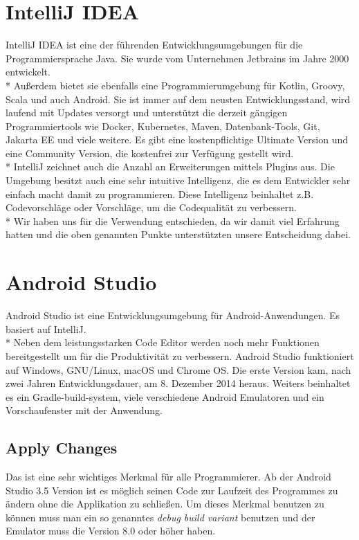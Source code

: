 \section{IntelliJ IDEA}
\author{Benjamin Besic}

IntelliJ IDEA ist eine der führenden Entwicklungsumgebungen für die Programmiersprache Java. Sie wurde vom Unternehmen Jetbrains im Jahre 2000 entwickelt.
\\* Außerdem bietet sie ebenfalls eine Programmierumgebung für Kotlin, Groovy, Scala und auch Android.
 Sie ist immer auf dem neusten Entwicklungsstand, wird laufend mit Updates versorgt und unterstützt die derzeit gängigen Programmiertools
wie Docker, Kubernetes, Maven, Datenbank-Tools, Git, Jakarta EE und viele weitere.
Es gibt eine kostenpflichtige Ultimate Version und eine Community Version, die kostenfrei zur Verfügung gestellt wird.
\\* IntelliJ zeichnet auch die Anzahl an Erweiterungen mittels Plugins aus. Die Umgebung besitzt auch eine
sehr intuitive Intelligenz, die es dem Entwickler sehr einfach macht damit zu programmieren. Diese Intelligenz beinhaltet z.B. Codevorschläge oder Vorschläge, um die Codequalität zu verbessern.
\cite{IntJ} \\*
Wir haben uns für die Verwendung entschieden, da wir damit viel Erfahrung hatten und die oben genannten Punkte
unterstützten unsere Entscheidung dabei.

\pagebreak
\section{Android Studio}
\cite{JetpackCompose-Overview}
\author{Bozidar Spasenovic}
Android Studio ist eine Entwicklungsumgebung für Android-Anwendungen. Es basiert auf IntelliJ.
\\* 
Neben dem leistungsstarken Code Editor werden noch mehr Funktionen bereitgestellt um für die Produktivität zu verbessern. 
Android Studio funktioniert auf Windows, GNU/Linux, macOS und Chrome OS. Die erste Version kam, nach zwei Jahren Entwicklungsdauer, am 8. Dezember 2014 heraus.
Weiters beinhaltet es ein Gradle-build-system, viele verschiedene Android Emulatoren und ein Vorschaufenster mit der Anwendung.


\subsection{Apply Changes}
\cite{Android-Studio-ApplyChange}
Das ist eine sehr wichtiges Merkmal für alle Programmierer. Ab der Android Studio 3.5 Version ist es möglich seinen Code
zur Laufzeit des Programmes zu ändern ohne die Applikation zu schließen. Um dieses Merkmal benutzen zu können muss man ein so genanntes \textit{debug build variant} benutzen
und der Emulator muss die Version 8.0 oder höher haben. 

